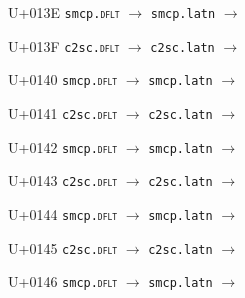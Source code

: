 \documentclass{article}
\begin{document}
\begin{substitutions}
\goodbreak

U+013E  \linebreak
    \texttt{smcp.\textsc{dflt}} $\to$  \linebreak
    \texttt{smcp.latn} $\to$  

\goodbreak

U+013F  \linebreak
    \texttt{c2sc.\textsc{dflt}} $\to$  \linebreak
    \texttt{c2sc.latn} $\to$  

\goodbreak

U+0140  \linebreak
    \texttt{smcp.\textsc{dflt}} $\to$  \linebreak
    \texttt{smcp.latn} $\to$  

\goodbreak

U+0141  \linebreak
    \texttt{c2sc.\textsc{dflt}} $\to$  \linebreak
    \texttt{c2sc.latn} $\to$  

\goodbreak

U+0142  \linebreak
    \texttt{smcp.\textsc{dflt}} $\to$  \linebreak
    \texttt{smcp.latn} $\to$  

\goodbreak

U+0143  \linebreak
    \texttt{c2sc.\textsc{dflt}} $\to$  \linebreak
    \texttt{c2sc.latn} $\to$  

\goodbreak

U+0144  \linebreak
    \texttt{smcp.\textsc{dflt}} $\to$  \linebreak
    \texttt{smcp.latn} $\to$  

\goodbreak

U+0145  \linebreak
    \texttt{c2sc.\textsc{dflt}} $\to$  \linebreak
    \texttt{c2sc.latn} $\to$  

\goodbreak

U+0146  \linebreak
    \texttt{smcp.\textsc{dflt}} $\to$  \linebreak
    \texttt{smcp.latn} $\to$  


\end{substitutions}
\end{document}
